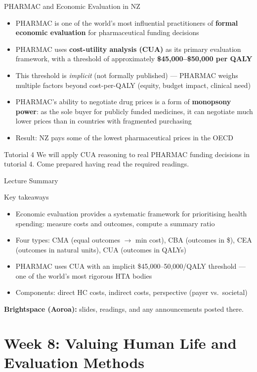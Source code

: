 \documentclass[aspectratio=169, 12pt]{beamer}
\newcommand{\summaryside}[1]{%
  \begin{frame}{Lecture Summary}
    \begin{exampleblock}{Key takeaways}
      \begin{itemize}#1\end{itemize}
    \end{exampleblock}
    \vspace{0.5em}
    {\footnotesize\textcolor{OtagoGold}{\textbf{Brightspace (Aoroa):}} slides, readings, and any announcements posted there.}
  \end{frame}}
\begin{document}
\begin{frame}{PHARMAC and Economic Evaluation in NZ}
  \begin{itemize}
    \item PHARMAC is one of the world's most influential practitioners of \textbf{formal
          economic evaluation} for pharmaceutical funding decisions
    \item PHARMAC uses \textbf{cost-utility analysis (CUA)} as its primary evaluation
          framework, with a threshold of approximately \textbf{\$45,000--\$50,000 per QALY}
    \item This threshold is \emph{implicit} (not formally published) --- PHARMAC weighs
          multiple factors beyond cost-per-QALY (equity, budget impact, clinical need)
    \item PHARMAC's ability to negotiate drug prices is a form of \textbf{monopsony power}:
          as the sole buyer for publicly funded medicines, it can negotiate much lower prices
          than in countries with fragmented purchasing
    \item Result: NZ pays some of the lowest pharmaceutical prices in the OECD
  \end{itemize}
  \begin{exampleblock}{Tutorial 4}
    We will apply CUA reasoning to real PHARMAC funding decisions in tutorial 4.
    Come prepared having read the required readings.
  \end{exampleblock}
\end{frame}

\summaryside{
  \item Economic evaluation provides a systematic framework for prioritising health spending: measure costs and outcomes, compute a summary ratio
  \item Four types: CMA (equal outcomes $\rightarrow$ min cost), CBA (outcomes in \$), CEA (outcomes in natural units), CUA (outcomes in QALYs)
  \item PHARMAC uses CUA with an implicit \$45,000--50,000/QALY threshold --- one of the world's most rigorous HTA bodies
  \item Components: direct HC costs, indirect costs, perspective (payer vs.\ societal)
}


\section{Week 8: Valuing Human Life and Evaluation Methods}
\end{document}
